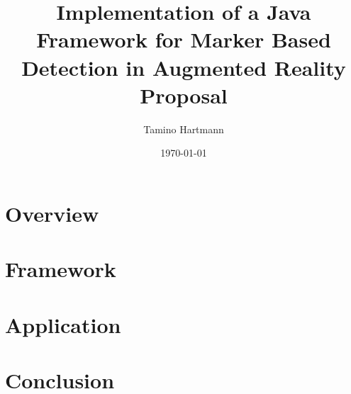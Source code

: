 \documentclass[a4paper,twoside]{article}
\begin{document}
\title{Implementation of a Java Framework for Marker Based Detection in Augmented Reality \\ {\large Proposal}}
\author{Tamino Hartmann}
\date{\today}

\maketitle
\thispagestyle{empty}



\newpage
\mbox{}

\newpage

\tableofcontents

\newpage
\section{Overview}

\newpage
\section{Framework}

\newpage
\section{Application}

\newpage
\section{Conclusion}


\newpage

\listoffigures

\end{document}
